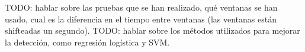 TODO: hablar sobre las pruebas que se han realizado, qué ventanas se han usado, cual es la diferencia en el tiempo entre ventanas (las ventanas están shifteadas un segundo).
TODO: hablar sobre los métodos utilizados para mejorar la detección, como regresión logística y SVM.